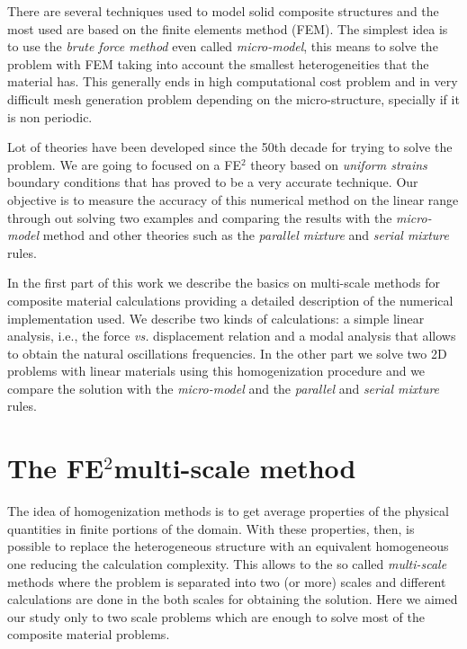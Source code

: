 \documentclass[3p]{elsarticle}
\newcommand{\fe}{FE$^2$}
\begin{document}
There are several techniques used to model solid composite structures and the
most used are based on the finite elements method (FEM).
The simplest idea is to use the \emph{brute force method}
even called \emph{micro-model}, this means to solve the problem with FEM
taking into account the smallest heterogeneities that the material has.
This generally ends in high computational cost problem and in very difficult mesh
generation problem depending on the micro-structure, specially if it is non
periodic.

Lot of theories have been developed since the 50th decade for trying to solve
the problem. We are going to focused on a FE$^2$ theory based on
\emph{uniform strains} boundary conditions that has proved to be a very accurate technique.
Our objective is to measure the accuracy of this numerical method on the linear 
range through out solving two examples and comparing the results with the 
\emph{micro-model} method and other theories such as the \emph{parallel mixture} 
and \emph{serial mixture} rules. 

In the first part of this work we describe the basics on multi-scale methods
for composite material calculations providing a detailed description of the
numerical implementation used. We describe two kinds of calculations: a simple
linear analysis, i.e., the force \emph{vs.} displacement relation
and a modal analysis that allows to obtain the natural oscillations
frequencies.
In the other part we solve two 2D problems with linear materials using this 
homogenization procedure and we compare the solution with the \emph{micro-model} 
and the \emph{parallel} and \emph{serial mixture} rules. 


\section{The \fe multi-scale method}

The idea of homogenization methods is to get average properties of the physical
quantities in finite portions of the domain. With these properties, then, is 
possible to replace the heterogeneous structure with an equivalent homogeneous
one reducing the calculation complexity. This allows to the so called
\emph{multi-scale} methods where the problem is separated into two (or more)
scales and different calculations are done in the both scales
for obtaining the solution. Here we aimed our study only to two scale problems
which are enough to solve most of the composite material problems.
\end{document}
